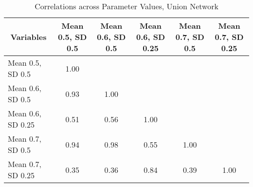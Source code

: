\begin{table}[htbp]\centering \caption{Correlations across Parameter Values, Union Network\label{corr_union}}
\begin{tabular}{l  c  c  c  c  c }\hline\hline
\multicolumn{1}{c}{Variables} &Mean 0.5, SD 0.5&Mean 0.6, SD 0.5&Mean 0.6, SD 0.25&Mean 0.7, SD 0.5&Mean 0.7, SD 0.25\\ \hline
Mean 0.5, SD 0.5&1.00\\
Mean 0.6, SD 0.5&0.93&1.00\\
Mean 0.6, SD 0.25&0.51&0.56&1.00\\
Mean 0.7, SD 0.5&0.94&0.98&0.55&1.00\\
Mean 0.7, SD 0.25&0.35&0.36&0.84&0.39&1.00\\
\hline \hline 
 \end{tabular}
\end{table}
